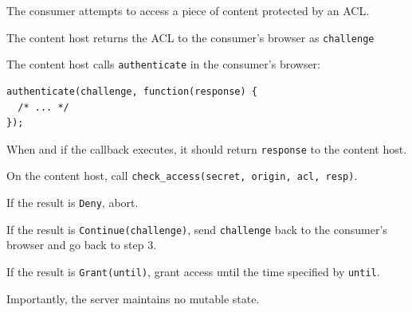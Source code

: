 \documentclass[pdftex,12pt,a4papaer,twoside,notitlepage]{report}
\begin{document}
\begin{compactenum}
\item The consumer attempts to access a piece of content protected by an ACL.
\item \server{} The content host returns the ACL to the consumer's browser as
  \texttt{challenge}
\item \client{} The content host calls \texttt{authenticate} in the
  consumer's browser:
  \begin{verbatim}
authenticate(challenge, function(response) {
  /* ... */
});
\end{verbatim}
\item \client{} When and if the callback executes, it should return
  \texttt{response} to the content host.
\item \server{} On the content host, call \verb=check_access(secret, origin, acl, resp)=.
\item \server{} If the result is \texttt{Deny}, abort.
\item \server{} If the result is \texttt{Continue(challenge)}, send \texttt{challenge}
  back to the consumer's browser and go back to step 3.
\item \server{} If the result is \texttt{Grant(until)}, grant access until the
  time specified by \texttt{until}.
\end{compactenum}

Importantly, the server maintains no mutable state.



\end{document}
